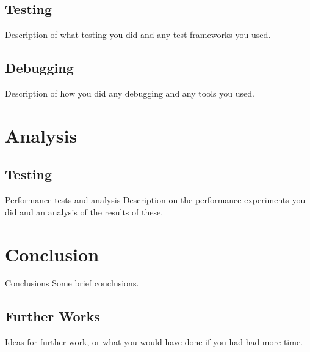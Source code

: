 \documentclass[a4paper,11pt]{article}
\begin{document}
\subsection{Testing}
Description of what testing you did and any test frameworks you used.

\subsection{Debugging}
 Description of how you did any debugging and any tools you used.
 
 \section{Analysis}
 
 \subsection{Testing}
Performance tests and analysis Description on the performance experiments you did and an analysis
of the results of these.
 
 \section{Conclusion}
Conclusions Some brief conclusions.
 
\subsection{Further Works}
 Ideas for further work, or what you would have done if you had had more time.
\end{document}
